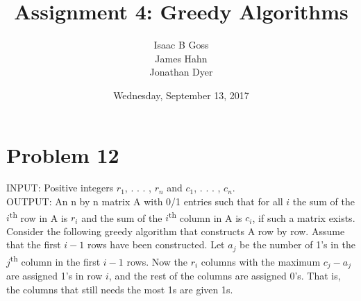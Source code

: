 \documentclass{article}
\author{Isaac B Goss\\ James Hahn\\ Jonathan Dyer}
\title{Assignment 4: Greedy Algorithms}
\date{Wednesday, September 13, 2017}
\providecommand{\prob}[1]{\section*{Problem #1}}
\begin{document}
	\maketitle
	
	\prob{12}
	INPUT: Positive integers $r_1$, . . . , $r_n$  and  $c_1$, . . . , $c_n$.\\
	OUTPUT: An n by n matrix A with 0/1 entries such that for all $i$ the sum of the $i$\textsuperscript{th} row in A is $r_i$ and the sum of the $i$\textsuperscript{th} column in A is $c_i$, if such a matrix exists.  Consider the following greedy algorithm that constructs A row by row. Assume that the first $i-1$ rows have been constructed. Let $a_j$ be the number of 1’s in the $j$\textsuperscript{th} column in the first $i − 1$ rows. Now
	the $r_i$ columns with the maximum $c_j − a_j$ are assigned 1’s in row $i$, and the rest of the columns are
	assigned 0’s. That is, the columns that still needs the most 1\textsc{}s are given 1\textsc{}s.
	
\end{document}

